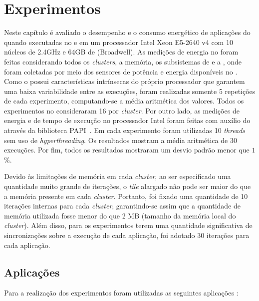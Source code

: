 \chapter{Experimentos}
\label{cha:experimentos}

Neste capítulo é avaliado o desempenho e o consumo energético de aplicações
\stencil do \pskel quando executadas no \mppa e em um processador Intel Xeon
E5-2640 v4 com 10 núcleos de 2.4GHz e 64GB de \ram (Broadwell). As medições de energia no \mppa
foram feitas considerando todos os \textit{clusters}, a memória, os subsistemas
de \es e a \noc, onde foram coletadas por meio dos sensores de potência e
energia disponíveis no \mppa. Como o \mppa possui características intrínsecas do
próprio processador que garantem uma baixa variabilidade entre as execuções, foram
realizadas somente 5 repetições de cada experimento, computando-se a média
aritmética dos valores. Todos os experimentos no \mppa consideraram 16
\pes por \textit{cluster}. Por outro lado, as medições de energia e de tempo de execução no
processador Intel foram feitas com auxílio do \rapl através da biblioteca PAPI~\cite{papi12}.
Em cada experimento foram utilizadas 10 \textit{threads} sem uso de
\textit{hyperthreading}. Os resultados mostram a média aritmética de 30
execuções. Por fim, todos os resultados mostraram um desvio padrão menor que
$1$\%.

Devido às limitações de memória em cada \textit{cluster}, ao ser especificado
uma quantidade muito grande de iterações, o \textit{tile} alargado não pode ser
maior do que a memória presente em cada \textit{cluster}. Portanto, foi fixado
uma quantidade de 10 iterações internas para cada \textit{cluster}, garantindo-se assim
que a quantidade de memória utilizada fosse menor do que 2 MB (tamanho da memória
local do \textit{cluster}). Além disso,
para os experimentos terem uma quantidade significativa de sincronizações sobre
a execução de cada aplicação, foi adotado 30 iterações para cada aplicação.

\section{Aplicações \stencil}
\label{cha:aplicacoes}

Para a realização dos experimentos foram utilizadas as seguintes aplicações \stencil:

